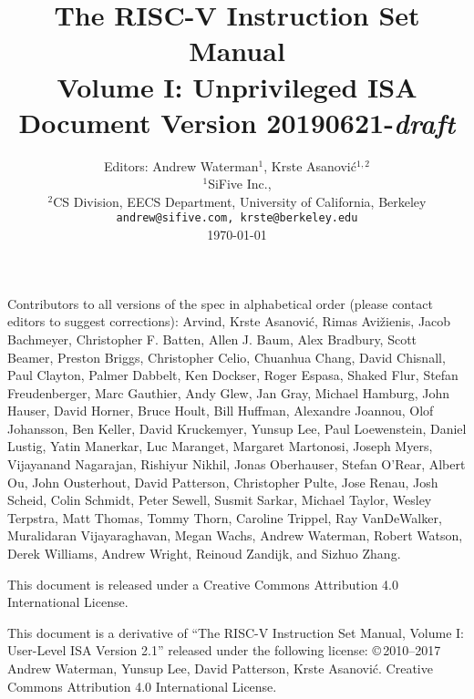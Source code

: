 \documentclass[twoside,11pt]{book}
\newcommand{\specrev}{\mbox{20190621-{\em draft}}}
\begin{document}
\title{\vspace{-0.7in}\Large {\bf The RISC-V Instruction Set Manual} \\
  \large {\bf Volume I: Unprivileged ISA} \\
  Document Version \specrev
  \vspace{-0.1in}}

\author{Editors: Andrew Waterman$^{1}$, Krste Asanovi\'{c}$^{1,2}$ \\
  $^{1}$SiFive Inc., \\
  $^{2}$CS Division, EECS Department, University of California, Berkeley \\
  {\tt andrew@sifive.com, krste@berkeley.edu} \\
  \today
}
\date{} 
\maketitle

Contributors to all versions of the spec in
alphabetical order (please contact editors to suggest
corrections):
Arvind, Krste Asanovi\'{c}, Rimas Avi\v{z}ienis, Jacob Bachmeyer, Christopher
F. Batten, Allen J. Baum, Alex Bradbury, Scott Beamer, Preston Briggs,
Christopher Celio, Chuanhua Chang, David Chisnall, Paul Clayton, Palmer
Dabbelt, Ken Dockser, Roger Espasa, Shaked Flur, Stefan Freudenberger,
Marc Gauthier, Andy Glew, Jan Gray, Michael Hamburg,
John Hauser, David Horner, Bruce Hoult, Bill Huffman, Alexandre Joannou,
Olof Johansson, Ben Keller, David Kruckemyer, Yunsup Lee,
Paul Loewenstein, Daniel Lustig, Yatin Manerkar, Luc Maranget, Margaret
Martonosi, Joseph Myers, Vijayanand Nagarajan, Rishiyur Nikhil, Jonas
Oberhauser, Stefan O'Rear, Albert Ou, John Ousterhout, David Patterson,
Christopher Pulte, Jose Renau, Josh Scheid, Colin Schmidt, Peter Sewell, Susmit Sarkar,
Michael Taylor, Wesley Terpstra, Matt Thomas, Tommy Thorn, Caroline Trippel,
Ray VanDeWalker, Muralidaran Vijayaraghavan, Megan Wachs, Andrew Waterman,
Robert Watson, Derek Williams, Andrew Wright, Reinoud Zandijk, and Sizhuo
Zhang.

This document is released under a Creative Commons Attribution 4.0
International License.

This document is a derivative of ``The RISC-V Instruction Set
Manual, Volume I: User-Level ISA Version 2.1'' released under the following license:
\copyright \,2010--2017 Andrew Waterman, Yunsup Lee, David Patterson, Krste Asanovi\'{c}. 
Creative Commons Attribution 4.0 International License.
\end{document}

